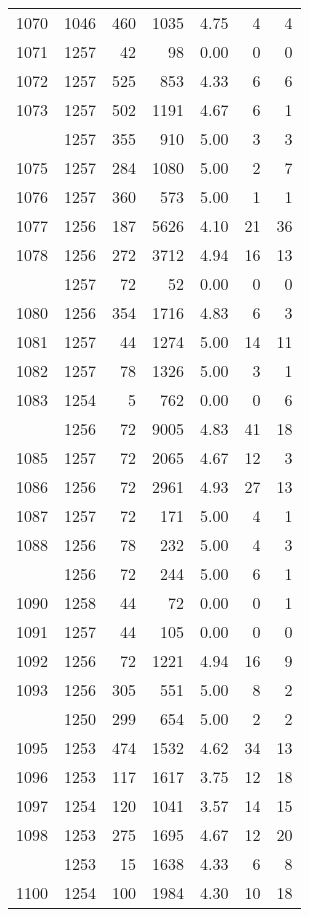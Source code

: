 \documentclass[
]{article}
\begin{document}
\begin{table}
\begin{tabular}[t]{lrrrrrr}
1070 & 1046 & 460 & 1035 & 4.75 & 4 & 4\\
1071 & 1257 & 42 & 98 & 0.00 & 0 & 0\\
1072 & 1257 & 525 & 853 & 4.33 & 6 & 6\\
1073 & 1257 & 502 & 1191 & 4.67 & 6 & 1\\
\addlinespace
1074 & 1257 & 355 & 910 & 5.00 & 3 & 3\\
1075 & 1257 & 284 & 1080 & 5.00 & 2 & 7\\
1076 & 1257 & 360 & 573 & 5.00 & 1 & 1\\
1077 & 1256 & 187 & 5626 & 4.10 & 21 & 36\\
1078 & 1256 & 272 & 3712 & 4.94 & 16 & 13\\
\addlinespace
1079 & 1257 & 72 & 52 & 0.00 & 0 & 0\\
1080 & 1256 & 354 & 1716 & 4.83 & 6 & 3\\
1081 & 1257 & 44 & 1274 & 5.00 & 14 & 11\\
1082 & 1257 & 78 & 1326 & 5.00 & 3 & 1\\
1083 & 1254 & 5 & 762 & 0.00 & 0 & 6\\
\addlinespace
1084 & 1256 & 72 & 9005 & 4.83 & 41 & 18\\
1085 & 1257 & 72 & 2065 & 4.67 & 12 & 3\\
1086 & 1256 & 72 & 2961 & 4.93 & 27 & 13\\
1087 & 1257 & 72 & 171 & 5.00 & 4 & 1\\
1088 & 1256 & 78 & 232 & 5.00 & 4 & 3\\
\addlinespace
1089 & 1256 & 72 & 244 & 5.00 & 6 & 1\\
1090 & 1258 & 44 & 72 & 0.00 & 0 & 1\\
1091 & 1257 & 44 & 105 & 0.00 & 0 & 0\\
1092 & 1256 & 72 & 1221 & 4.94 & 16 & 9\\
1093 & 1256 & 305 & 551 & 5.00 & 8 & 2\\
\addlinespace
1094 & 1250 & 299 & 654 & 5.00 & 2 & 2\\
1095 & 1253 & 474 & 1532 & 4.62 & 34 & 13\\
1096 & 1253 & 117 & 1617 & 3.75 & 12 & 18\\
1097 & 1254 & 120 & 1041 & 3.57 & 14 & 15\\
1098 & 1253 & 275 & 1695 & 4.67 & 12 & 20\\
\addlinespace
1099 & 1253 & 15 & 1638 & 4.33 & 6 & 8\\
1100 & 1254 & 100 & 1984 & 4.30 & 10 & 18\\

\end{tabular}
\end{table}
\end{document}
